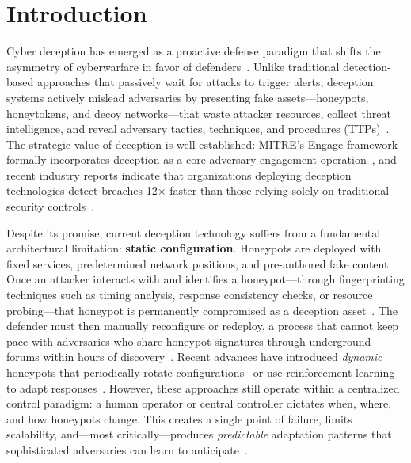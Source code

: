 \documentclass[review,3p,twocolumn]{elsarticle}
\begin{document}
\section{Introduction}
\label{sec:intro}

Cyber deception has emerged as a proactive defense paradigm that shifts the asymmetry of cyberwarfare in favor of defenders~\cite{rowe2016introduction}. Unlike traditional detection-based approaches that passively wait for attacks to trigger alerts, deception systems actively mislead adversaries by presenting fake assets---honeypots, honeytokens, and decoy networks---that waste attacker resources, collect threat intelligence, and reveal adversary tactics, techniques, and procedures (TTPs)~\cite{han2018deception}. The strategic value of deception is well-established: MITRE's Engage framework formally incorporates deception as a core adversary engagement operation~\cite{mitre2022engage}, and recent industry reports indicate that organizations deploying deception technologies detect breaches 12$\times$ faster than those relying solely on traditional security controls~\cite{acalvio2023deception}.

Despite its promise, current deception technology suffers from a fundamental architectural limitation: \textbf{static configuration}. Honeypots are deployed with fixed services, predetermined network positions, and pre-authored fake content. Once an attacker interacts with and identifies a honeypot---through fingerprinting techniques such as timing analysis, response consistency checks, or resource probing---that honeypot is permanently compromised as a deception asset~\cite{vetterl2020counting}. The defender must then manually reconfigure or redeploy, a process that cannot keep pace with adversaries who share honeypot signatures through underground forums within hours of discovery~\cite{zamiri2019gas}. Recent advances have introduced \emph{dynamic} honeypots that periodically rotate configurations~\cite{wagener2009self} or use reinforcement learning to adapt responses~\cite{dowling2019using}. However, these approaches still operate within a centralized control paradigm: a human operator or central controller dictates when, where, and how honeypots change. This creates a single point of failure, limits scalability, and---most critically---produces \emph{predictable} adaptation patterns that sophisticated adversaries can learn to anticipate~\cite{carroll2011game}.
\end{document}
